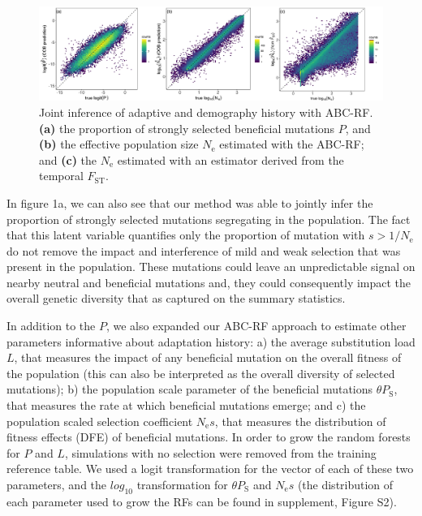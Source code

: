 \documentclass[a4paper, 12pt]{article}
\begin{document}
\begin{figure}[ht]
  \centering
  \label{fig:fig1}
  \includegraphics[width=1\textwidth]{Figures/joint_demosel_ggplot2_mod.pdf}
  \captionsetup{font=footnotesize}
  \caption{Joint inference of adaptive and demography history with ABC-RF. \textbf{(a)} the proportion of strongly selected beneficial mutations $P$, and \textbf{(b)} the effective population size $N_{\mathrm{e}}$ estimated with the ABC-RF; and \textbf{(c)} the $N_{\mathrm{e}}$ estimated with an estimator derived from the temporal $F_{\mathrm{ST}}$.}
\end{figure}

In figure 1a, we can also see that our method was able to jointly infer the proportion of strongly selected mutations segregating in the population. The fact that this latent variable quantifies only the proportion of mutation with $s > 1/N_{\mathrm{e}}$ do not remove the impact and interference of mild and weak selection that was present in the population. These mutations could leave an unpredictable signal on nearby neutral and beneficial mutations and, they could consequently impact the overall genetic diversity that as captured on the summary statistics.

In addition to the $P$, we also expanded our ABC-RF approach to estimate other parameters informative about adaptation history: a) the average substitution load $L$, that measures the impact of any beneficial mutation on the overall fitness of the population (this can also be interpreted as the overall diversity of selected mutations); b) the population scale parameter of the beneficial mutations $\theta P_{\mathrm{S}}$, that measures the rate at which  beneficial mutations emerge; and c) the population scaled selection coefficient $N_{\mathrm{e}}s$, that measures the distribution of fitness effects (DFE) of beneficial mutations. In order to grow the random forests for $P$ and $L$, simulations with no selection were removed from the training reference table. We used a logit transformation for the vector of each of these two parameters, and the $log_{\mathrm{10}}$ transformation for $\theta P_{\mathrm{S}}$ and $N_{\mathrm{e}}s$ (the distribution of each parameter used to grow the RFs can be found in supplement, Figure S2). 
\end{document}
